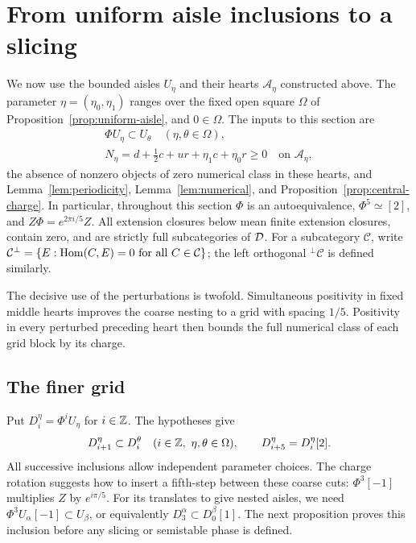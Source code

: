 \section{From uniform aisle inclusions to a slicing}
\label{sec:grid}

We now use the bounded aisles $U_\eta$ and their hearts
$\mathcal A_\eta$ constructed above.  The parameter $\eta=(\eta_0,\eta_1)$
ranges over the fixed open square $\Omega$ of
Proposition~\ref{prop:uniform-aisle}, and $0\in\Omega$.  The inputs to this
section are
\begin{equation}\label{eq:grid-inputs}
 \begin{gathered}
 \Phi U_\eta\subset U_\theta
 \quad(\eta,\theta\in\Omega),\\
 N_\eta=d+\tfrac12c+ur+\eta_1c+\eta_0r\ge0
 \quad\text{on }\mathcal A_\eta,
 \end{gathered}
\end{equation}
the absence of nonzero objects of zero numerical class in these hearts,
and Lemma~\ref{lem:periodicity}, Lemma~\ref{lem:numerical}, and
Proposition~\ref{prop:central-charge}.  In particular, throughout this
section $\Phi$ is an autoequivalence, $\Phi^5\simeq[2]$, and
$Z\Phi=e^{2\pi i/5}Z$.  All extension closures below mean finite extension
closures, contain zero, and are strictly full subcategories of $\mathcal D$.
For a subcategory $\mathcal C$, write
$\mathcal C^\perp=\{E:\operatorname{Hom}(C,E)=0\text{ for all }C\in\mathcal C\}$;
the left orthogonal ${}^\perp\mathcal C$ is defined similarly.

The decisive use of the perturbations is twofold.  Simultaneous positivity
in fixed middle hearts improves the coarse nesting to a grid with spacing
$1/5$.  Positivity in every perturbed preceding heart then bounds the full
numerical class of each grid block by its charge.

\subsection{The finer grid}

Put $D_i^\eta=\Phi^iU_\eta$ for $i\in\mathbb Z$.  The hypotheses give
\begin{equation}\label{eq:coarse-grid}
 D_{i+1}^\eta\subset D_i^\theta\quad
 (i\in\mathbb Z,\ \eta,\theta\in\Omega),\qquad
 D_{i+5}^\eta=D_i^\eta[2].
\end{equation}
All successive inclusions allow independent parameter choices.
The charge rotation suggests how to insert a fifth-step between these
coarse cuts: $\Phi^3[-1]$ multiplies $Z$ by $e^{i\pi/5}$.
For its translates to give nested aisles, we need
$\Phi^3U_\alpha[-1]\subset U_\beta$, or equivalently
$D_3^\alpha\subset D_0^\beta[1]$.  The next proposition proves this
inclusion before any slicing or semistable phase is defined.

